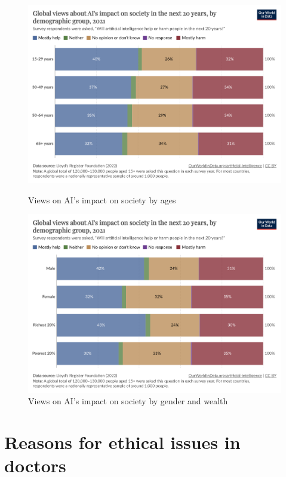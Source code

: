 \documentclass[paper=a4, fontsize=11pt]{scrartcl} %
\numberwithin{equation}{section} %
\numberwithin{figure}{section} %
\numberwithin{table}{section} %
\begin{document}
\begin{figure}[htbp]
    \centering
    \begin{minipage}[t]{0.48\linewidth}
        \includegraphics[width=\linewidth]{./data/influence_by_ages.png}
        \caption{Views on AI's impact on society by ages}
        \label{fig:investment}
    \end{minipage}\hfill
    \begin{minipage}[t]{0.48\linewidth}
        \includegraphics[width=\linewidth]{./data/influence_by_demographic_group.png}
        \caption{Views on AI's impact on society by gender and wealth}
        \label{fig:views_ai_impact}
    \end{minipage}
\end{figure}


\section{Reasons for ethical issues in doctors}
\end{document}
